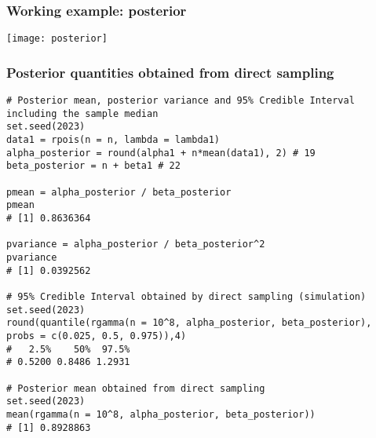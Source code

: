 \documentclass[border=5mm, convert, usenames, dvipsnames,beamer]{standalone}
\begin{document}
\begin{frame}[ fragile]{}
\frametitle{Working example: posterior}

\vspace{50}
\noindent

 \texttt{[image: posterior]}


\end{frame}





\begin{frame}[ fragile]{}

\frametitle{Posterior quantities obtained from direct sampling}

\vspace{50}
\noindent

\tiny
\par

\begin{lstlisting}[style=
R]
# Posterior mean, posterior variance and 95% Credible Interval including the sample median
set.seed(2023)
data1 = rpois(n = n, lambda = lambda1)
alpha_posterior = round(alpha1 + n*mean(data1), 2) # 19
beta_posterior = n + beta1 # 22

pmean = alpha_posterior / beta_posterior
pmean
# [1] 0.8636364

pvariance = alpha_posterior / beta_posterior^2
pvariance
# [1] 0.0392562

# 95% Credible Interval obtained by direct sampling (simulation)
set.seed(2023)
round(quantile(rgamma(n = 10^8, alpha_posterior, beta_posterior), probs = c(0.025, 0.5, 0.975)),4)
#   2.5%    50%  97.5% 
# 0.5200 0.8486 1.2931 

# Posterior mean obtained from direct sampling
set.seed(2023)
mean(rgamma(n = 10^8, alpha_posterior, beta_posterior))
# [1] 0.8928863
\end{lstlisting}




\par
\end{frame}
\end{document}
